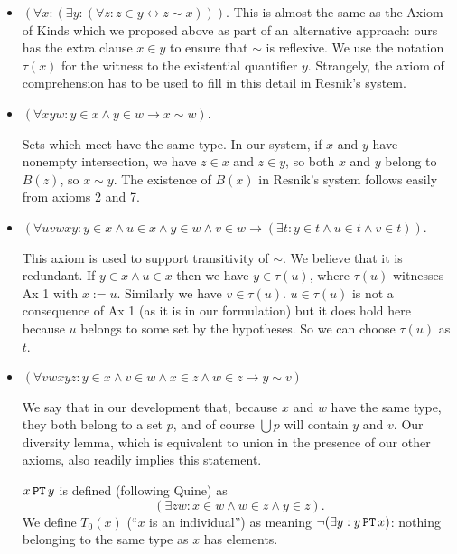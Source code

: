 \documentclass[12pt]{article}
\begin{document}
\begin{itemize}
\item[R1:]

$(\forall x:(\exists y:(\forall z:z \in y \leftrightarrow z \sim x)))$.  This is almost the same as the Axiom of Kinds which we proposed above as part of an alternative approach:  ours has the extra clause $x \in y$ to ensure that $\sim$ is reflexive.  We use the notation $\tau(x)$ for the witness to the existential quantifier $y$.  Strangely, the axiom of comprehension has to be used to fill in this detail in Resnik's system.

\item[R2:]

  $(\forall xyw:y \in x \wedge y \in w \rightarrow x \sim w)$.

  Sets which meet have the same type.   In our system, if $x$ and $y$ have nonempty intersection, we have $z \in x$ and $z \in y$, so both $x$ and $y$ belong to $B(z)$, so $x \sim y$.  The existence of $B(x)$ in Resnik's system follows easily from axioms 2 and 7.

\item[R3:]

  $(\forall uvwxy:  y \in x \wedge u \in x \wedge y \in w \wedge v \in w \rightarrow (\exists t:y \in t \wedge u \in t \wedge v \in t))$.

  This axiom is used to support transitivity of $\sim$.  We believe that it is redundant.  If $y \in x \wedge u \in x$ then we have $y \in \tau(u)$, where $\tau(u)$ witnesses Ax 1 with $x := u$.  Similarly we have $v \in \tau(u)$.  $u \in \tau(u)$ is not a consequence of Ax 1 (as it is in our formulation) but it does hold here because $u$ belongs to some set by the hypotheses.  So we can choose $\tau(u)$ as $t$.

\item[R4:]  $(\forall vwxyz:y \in x \wedge v \in w \wedge x \in z \wedge w \in z \rightarrow y \sim v)$

  We say that in our development that, because $x$ and $w$ have the same type, they both belong to a set $p$, and of course $\bigcup p$ will contain $y$ and $v$.  Our diversity lemma, which is equivalent to union in the presence of our other axioms, also readily implies this statement.



\begin{dfn}  $x \, {\tt PT} \, y$ is defined (following Quine) as $$(\exists zw:x \in w \wedge w \in z \wedge y \in z).$$  We define $T_0(x)$ (``$x$ is an individual'') as meaning $\neg(\exists y:y \, {\tt PT} \, x)$:  nothing belonging to the same type as $x$ has elements.\end{dfn}


\end{itemize}
\end{document}
